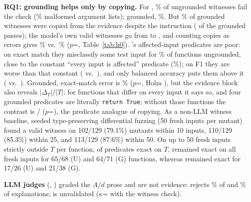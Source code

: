 \textbf{RQ1: grounding helps only by copying.} For \GenModel{}, \PzWitGenRawA\% of ungrounded witnesses fail the check
(\PzFailGenUngroundedMalformedwitness\% malformed argument lists); grounded, \PzWitGenRawB\%. But \PzWitGenCopied\% of grounded witnesses were copied from the evidence despite the
instruction (\SWitGenCopiedPass{} of the grounded passes); the model's own valid witnesses go from \SWitGenOwnValidU{}
to \SWitGenOwnValidG{}, and counting copies as errors gives \PWitGenStrictB\% vs.\ \PWitGenStrictA\% ($p$=\SWitGenStrictPHolm,
Table~\ref{tab:h0}). \GenModel's affected-input predicates are poor: on exact match they misclassify some test input for
\PzPredGenExactA\% of functions ungrounded, close to the constant ``every input is affected'' predicate
(\PzPredGenTrivialExactErr\%); on F1 they are worse than that constant (\PPredGenUFone{} vs.\ \PPredGenTrivialFone), and only
balanced accuracy puts them above it (\PPredGenBalaccU{} vs.\ \PPredGenTrivialBal). Grounded, exact-match error is
\PzPredGenExactB\% ($p$=\SPredGenExactP, Holm \SPredGenExactPHolm), but the evidence block also reveals $|\Delta_T|/|T|$:
for functions that differ on every input it says so, and four grounded predicates are literally \texttt{return True};
without those functions the contrast is \SPredGenExactNotalldifferNonezero/\SPredGenExactNotalldifferNzeroone{}
($p$=\SPredGenExactNotalldifferP), the predicate analogue of copying. As a non-LLM witness baseline, seeded type-preserving differential fuzzing (50 fresh inputs per mutant) found a valid witness on 102/129 (79.1\%) mutants within 10 inputs, 110/129 (85.3\%) within 25, and 113/129 (87.6\%) within 50. On up to 50 fresh inputs strictly outside $T$ per function, of predicates exact on $T$, \StrongModel{} remained exact on all fresh inputs for 65/68 (U) and 64/71 (G) functions, whereas \GenModel{} remained exact for 17/26 (U) and 21/38 (G).


\textbf{LLM judges} (\JudgeA, \JudgeB) graded the $A$/$d$ prose and are not evidence: \JudgeA{} rejects
\PzJoneRejectRateGen\% of \GenModel{} and \PzJoneRejectRateStrong\% of \StrongModel{} explanations; \JudgeB{} is unvalidated ($\kappa$=\SJtwoProgKappaGen{}
with the witness check).

